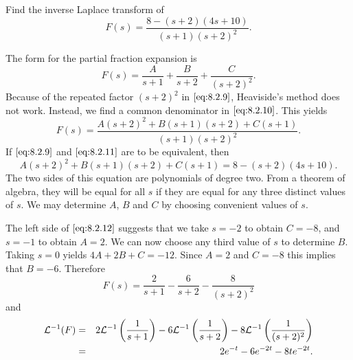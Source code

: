 \documentclass{ximera}
\begin{document}
\begin{example}\label{example:8.2.6} Find the inverse Laplace transform
of
\begin{equation}\label{eq:8.2.9}
F(s)=\frac{8-(s+2)(4s+10)}{(s+1)(s+2)^2}.
\end{equation}
\begin{explanation}
The  form for the partial fraction expansion  is
\begin{equation}\label{eq:8.2.10}
F(s)=\frac{A}{s+1}+\frac{B}{s+2}+\frac{C}{(s+2)^2}.
\end{equation}
Because of the repeated factor $(s+2)^2$ in $\eqref{eq:8.2.9}$, Heaviside's
method does not work. Instead, we find a common denominator in
$\eqref{eq:8.2.10}$. This yields
\begin{equation}\label{eq:8.2.11}
F(s)=\frac{A(s+2)^2+B(s+1)(s+2)+C(s+1)}{(s+1)(s+2)^2}.
\end{equation}
If $\eqref{eq:8.2.9}$ and  $\eqref{eq:8.2.11}$ are to be equivalent, then
\begin{equation}\label{eq:8.2.12}
A(s+2)^2+B(s+1)(s+2)+C(s+1)=8-(s+2)(4s+10).
\end{equation}
The two sides of this equation are polynomials of degree two. From a
theorem of algebra, they will be equal for all $s$ if they are equal
for any three distinct values of $s$. We may determine $A$, $B$ and
$C$ by choosing convenient values of $s$.

The left side of $\eqref{eq:8.2.12}$ suggests that we take $s=-2$ to obtain
$C=-8$, and $s=-1$ to obtain $A=2$. We can now choose any third value
of $s$ to determine $B$. Taking $s=0$ yields $4A+2B+C=-12$. Since
$A=2$ and $C=-8$ this implies that $B=-6$. Therefore
$$
F(s)=\frac{2}{s+1}-\frac{6}{s+2}-\frac{8}{(s+2)^2}
$$
and
\begin{eqnarray*}
{\cal L}^{-1}(F)&=&
2{\cal L}^{-1}\left(\frac{1}{s+1}\right)-6{\cal L}^{-1}\left(\frac{1}{s+2}\right)-8{\cal L}^{-1}\left(\frac{1}{(s+2)^2}\right)\\
&=&2e^{-t}-6e^{-2t}-8te^{-2t}.
\end{eqnarray*}
\end{explanation}
\end{example}
\end{document}
